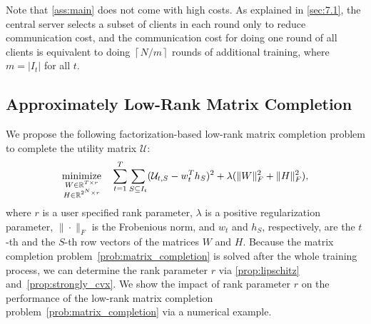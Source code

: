 Note that \autoref{ass:main} does not come with high costs. As explained in \autoref{sec:7.1}, the central server selects a subset of clients in each round only to reduce communication cost, and the communication cost for doing one round of all clients is equivalent to doing $\left \lceil{N / m}\right \rceil $ rounds of additional training, where $m = |I_t|$ for all $t$. 

\subsection{Approximately Low-Rank Matrix Completion} \label{sec:7.5.2}

We propose the following factorization-based low-rank matrix completion problem to complete the utility matrix $\mathcal{U}$: 
\begin{equation}
\label{prob:matrix_completion}
\displaystyle\mathop{\hbox{\rm minimize}}_{\substack{W \in \mathbb{R}^{T \times r}\\ H \in \mathbb{R}^{2^N \times r}}}\enspace \enspace \sum_{t=1}^T\sum_{S\subseteq I_t} (\mathcal{U}_{t,S} - w_t^Th_{S})^2 + 
\lambda(\|W\|_F^2 + \|H\|_F^2),
\end{equation}
where $r$ is a user specified rank parameter, $\lambda$ is a positive regularization parameter, $\|\cdot\|_F$ is the Frobenious norm, and $w_t$ and $h_S$, respectively, are the $t$-th and the $S$-th row vectors of the matrices $W$ and $H$. Because the matrix completion problem~\eqref{prob:matrix_completion} is solved after the whole training process, we can determine the rank parameter $r$ via \autoref{prop:lipschitz} and~\autoref{prop:strongly_cvx}. We show the impact of rank parameter $r$ on the performance of the low-rank matrix completion problem~\eqref{prob:matrix_completion} via a numerical example.

